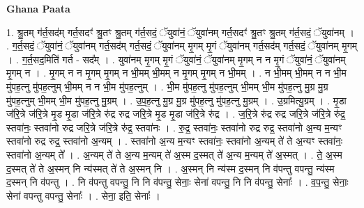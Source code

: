 \documentclass[17pt]{extarticle}
\begin{document}
\textbf{Ghana Paata } \newline

1. श्रु॒तम् ग॑र्त॒सद॑म् गर्त॒सदꣳ॑ श्रु॒तꣳ श्रु॒तम् ग॑र्त॒सदं॒ ॅयुवा॑नं॒ ॅयुवा॑नम् गर्त॒सदꣳ॑ श्रु॒तꣳ श्रु॒तम् ग॑र्त॒सदं॒ ॅयुवा॑नम् । . ग॒र्त॒सदं॒ ॅयुवा॑नं॒ ॅयुवा॑नम् गर्त॒सद॑म् गर्त॒सदं॒ ॅयुवा॑नम् मृ॒गम् मृ॒गं ॅयुवा॑नम् गर्त॒सद॑म् गर्त॒सदं॒ ॅयुवा॑नम् मृ॒गम् । . ग॒र्त॒सद॒मिति॑ गर्त - सद᳚म् । . युवा॑नम् मृ॒गम् मृ॒गं ॅयुवा॑नं॒ ॅयुवा॑नम् मृ॒गम् न न मृ॒गं ॅयुवा॑नं॒ ॅयुवा॑नम् मृ॒गम् न । . मृ॒गम् न न मृ॒गम् मृ॒गम् न भी॒मम् भी॒मम् न मृ॒गम् मृ॒गम् न भी॒मम् । . न भी॒मम् भी॒मम् न न भी॒म मु॑पह॒त्नु मु॑पह॒त्नुम् भी॒मम् न न भी॒म मु॑पह॒त्नुम् । . भी॒म मु॑पह॒त्नु मु॑पह॒त्नुम् भी॒मम् भी॒म मु॑पह॒त्नु मु॒ग्र मु॒ग्र मु॑पह॒त्नुम् भी॒मम् भी॒म मु॑पह॒त्नु मु॒ग्रम् । . उ॒प॒ह॒त्नु मु॒ग्र मु॒ग्र मु॑पह॒त्नु मु॑पह॒त्नु मु॒ग्रम् । . उ॒ग्रमित्यु॒ग्रम् । . मृ॒डा ज॑रि॒त्रे ज॑रि॒त्रे मृ॒ड मृ॒डा ज॑रि॒त्रे रु॑द्र रुद्र जरि॒त्रे मृ॒ड मृ॒डा ज॑रि॒त्रे रु॑द्र । . ज॒रि॒त्रे रु॑द्र रुद्र जरि॒त्रे ज॑रि॒त्रे रु॑द्र॒ स्तवा॑नः॒ स्तवा॑नो रुद्र जरि॒त्रे ज॑रि॒त्रे रु॑द्र॒ स्तवा॑नः । . रु॒द्र॒ स्तवा॑नः॒ स्तवा॑नो रुद्र रुद्र॒ स्तवा॑नो अ॒न्य म॒न्यꣳ स्तवा॑नो रुद्र रुद्र॒ स्तवा॑नो अ॒न्यम् । . स्तवा॑नो अ॒न्य म॒न्यꣳ स्तवा॑नः॒ स्तवा॑नो अ॒न्यम् ते॑ ते अ॒न्यꣳ स्तवा॑नः॒ स्तवा॑नो अ॒न्यम् ते᳚ । . अ॒न्यम् ते॑ ते अ॒न्य म॒न्यम् ते॑ अ॒स्म द॒स्मत् ते॑ अ॒न्य म॒न्यम् ते॑ अ॒स्मत् । . ते॒ अ॒स्म द॒स्मत् ते॑ ते अ॒स्मन् नि न्य॑स्मत् ते॑ ते अ॒स्मन् नि । . अ॒स्मन् नि न्य॑स्म द॒स्मन् नि व॑पन्तु वपन्तु॒ न्य॑स्म द॒स्मन् नि व॑पन्तु । . नि व॑पन्तु वपन्तु॒ नि नि व॑पन्तु॒ सेनाः॒ सेना॑ वपन्तु॒ नि नि व॑पन्तु॒ सेनाः᳚ । . व॒प॒न्तु॒ सेनाः॒ सेना॑ वपन्तु वपन्तु॒ सेनाः᳚ । . सेना॒ इति॒ सेनाः᳚ । \newline
\end{document}
